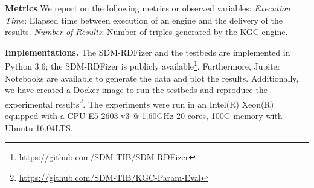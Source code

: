 \noindent \textbf{Metrics}
We report on the following metrics or observed variables: 
\textit{Execution Time}: Elapsed time between execution of an engine and the delivery of the results.
\textit{Number of Results}: Number of triples generated by the KGC engine.

\noindent \textbf{Implementations.} 
The SDM-RDFizer and the testbeds are implemented in Python 3.6; the SDM-RDFizer is publicly available\footnote{\url{https://github.com/SDM-TIB/SDM-RDFizer}}. Furthermore, Jupiter Notebooks are available to generate the data and plot the results. Additionally, we have created a Docker image to run the testbeds and reproduce the experimental results\footnote{\url{https://github.com/SDM-TIB/KGC-Param-Eval}}. The experiments were run in an Intel(R) Xeon(R) equipped with a CPU E5-2603 v3 @ 1.60GHz 20 cores, 100G memory with Ubuntu 16.04LTS.





